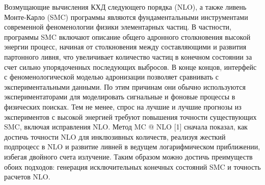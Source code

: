 Возмущающие вычисления КХД следующего порядка (NLO), а также ливень Монте-Карло
(SMC) программы являются фундаментальными инструментами современной феноменологии физики элементарных частиц. В частности, программы SMC включают описание общего адронного столкновения высокой энергии
процесс, начиная от столкновения между составляющими и развития партонного ливня, что
увеличивает количество частиц в конечном состоянии за счет сильно упорядоченных последующих выбросов.
В конце концов, интерфейс с феноменологической моделью адронизации позволяет сравнивать
с экспериментальными данными. По этим причинам они обычно используются экспериментаторами для
моделировать сигнальные и фоновые процессы в физических поисках. Тем не менее, спрос на
лучшие и лучшие прогнозы из экспериментов с высокой энергией требуют повышения точности
существующих SMC, включая исправления NLO. Метод MC @ NLO [1] сначала показал, как
достичь точности NLO для инклюзивных количеств, реализуя жесткий подпроцесс в NLO и
развитие ливней в ведущем логарифмическом приближении, избегая двойного счета
излучение. Таким образом можно достичь преимуществ обоих подходов: генерация исключительных конечных состояний
SMC и точность расчетов NLO.
